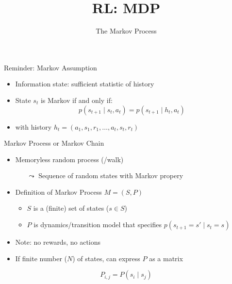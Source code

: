 


\title[Reinforcement Learning: Big Picture]{RL: MDP}
\subtitle{The Markov Process}




	
	\maketitle

\begin{frame}[c]{Reminder: Markov Assumption}

\begin{itemize}
	\item Information state: sufficient statistic of history
	\item State $s_t$ is Markov if and only if:
	$$ p(s_{t+1} \mid s_t, a_t) = p(s_{t+1} \mid h_t, a_t)$$
	\item with history $h_t = (a_1, s_1, r_1, \ldots, a_t, s_t, r_t)$
\end{itemize}

\end{frame}
\begin{frame}[c]{Markov Process or Markov Chain}
	
	\begin{itemize}
		\item Memoryless random process (/walk)
		\begin{itemize}
			\item[$\leadsto$] Sequence of random states with Markov propery
		\end{itemize}
		\item Definition of Markov Process $M = (S, P)$
		\begin{itemize}
			\item $S$ is a (finite) set of states ($s \in S$)
			\item $P$ is dynamics/transition model that specifies $p(s_{t+1} = s' \mid s_t = s)$
		\end{itemize}
		\item Note: no rewards, no actions
		\item If finite number ($N$) of states, can express $P$ as a matrix
	\end{itemize}

$$P_{i,j} = P(s_i \mid s_j) $$
	
\end{frame}
